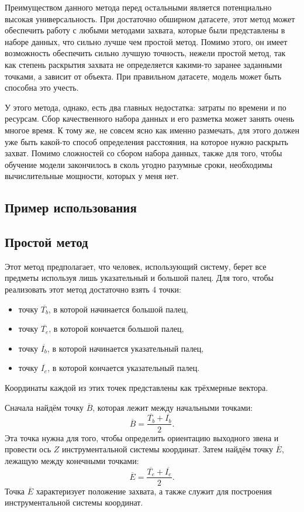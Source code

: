 \documentclass[14pt, a4paper]{extarticle}
\begin{document}
Преимуществом данного метода перед остальными является потенциально высокая
универсальность. При достаточно обширном датасете, этот метод может обеспечить
работу с любыми методами захвата, которые были представлены в наборе данных,
что сильно лучше чем простой метод. Помимо этого, он имеет возможность
обеспечить сильно лучшую точность, нежели простой метод, так как степень
раскрытия захвата не определяется какими-то заранее заданными точками, а
зависит от объекта. При правильном датасете, модель может быть способна это
учесть.

У этого метода, однако, есть два главных недостатка: затраты по времени и по
ресурсам. Сбор качественного набора данных и его разметка может занять очень
многое время. К тому же, не совсем ясно как именно размечать, для этого должен
уже быть какой-то способ определения расстояния, на которое нужно раскрыть
захват. Помимо сложностей со сбором набора данных, также для того, чтобы
обучение модели закончилось в сколь угодно разумные сроки, необходимы
вычислительные мощности, которых у меня нет.

\subsection{Пример использования}



\subsection{Простой метод}
\label{sec:gripper_basic_method}
Этот метод предполагает, что человек, использующий систему, берет все предметы
используя лишь указательный и большой палец. 
Для того, чтобы реализовать этот метод достаточно взять 4 точки:
\begin{itemize}
  \item точку $\overline{T_b}$, в которой начинается большой палец,
  \item точку $\overline{T_e}$, в которой кончается большой палец,
  \item точку $\overline{I_b}$, в которой начинается указательный палец,
  \item точку $\overline{I_e}$, в которой кончается указательный палец.
\end{itemize}
Координаты каждой из этих точек представлены как трёхмерные вектора.

Сначала найдём точку $\overline{B}$, которая лежит между начальными точками:
\begin{equation}
  \overline{B} = \frac{\overline{T_b} + \overline{I_b}}{2}.
\end{equation}
Эта точка нужна для того, чтобы определить ориентацию выходного звена и
провести ось $Z$ инструментальной системы координат.
Затем найдём точку $\overline{E}$, лежащую между конечными точками:
\begin{equation}
  \overline{E} = \frac{\overline{T_e} + \overline{I_e}}{2}.
\end{equation}
Точка $\overline{E}$ характеризует положение захвата, а также служит для
построения инструментальной системы координат.
\end{document}
